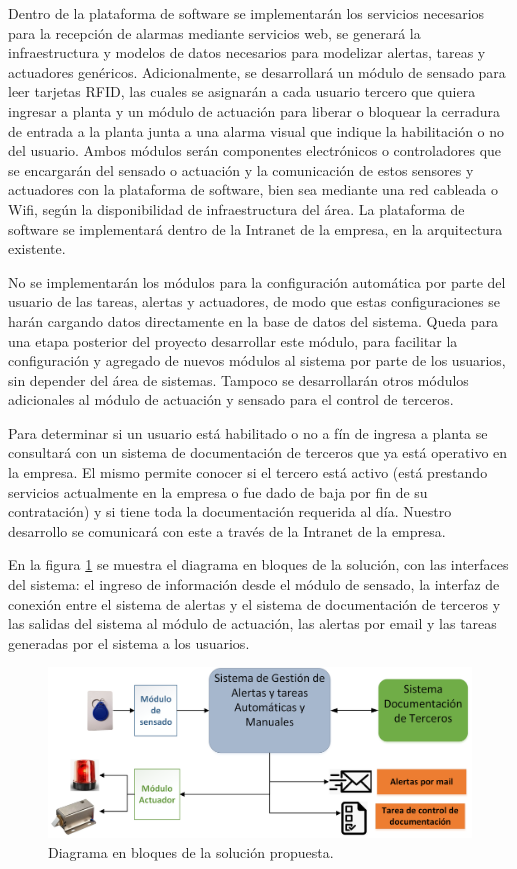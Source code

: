 Dentro de la plataforma de software se implementarán los servicios necesarios para la recepción de alarmas mediante servicios web, se generará la infraestructura y modelos de datos necesarios para modelizar alertas, tareas y actuadores genéricos. Adicionalmente, se desarrollará un módulo de sensado para leer tarjetas RFID, las cuales se asignarán a cada usuario tercero que quiera ingresar a planta y un módulo de actuación para liberar o bloquear la cerradura de entrada a la planta junta a una alarma visual que indique la habilitación o no del usuario. Ambos módulos serán componentes electrónicos o controladores que se encargarán del sensado o actuación y la comunicación de estos sensores y actuadores con la plataforma de software, bien sea mediante una red cableada o Wifi, según la disponibilidad de infraestructura del área. La plataforma de software se implementará dentro de la Intranet de la empresa, en la arquitectura existente.

No se implementarán los módulos para la configuración automática por parte del usuario de las tareas, alertas y actuadores, de modo que estas configuraciones se harán cargando datos directamente en la base de datos del sistema. Queda para una etapa posterior del proyecto desarrollar este módulo, para facilitar la configuración y agregado de nuevos módulos al sistema por parte de los usuarios, sin depender del área de sistemas. Tampoco se desarrollarán otros módulos adicionales al módulo de actuación y sensado para el control de terceros.

Para determinar si un usuario está habilitado o no a fín de ingresa a planta se consultará con un sistema de documentación de terceros que ya está operativo en la empresa. El mismo permite conocer si el tercero está activo (está prestando servicios actualmente en la empresa o fue dado de baja por fin de su contratación) y si tiene toda la documentación requerida al día. Nuestro desarrollo se comunicará con este a través de la Intranet de la empresa.

En la figura \ref{fig:Solucionbasica} se muestra el diagrama en bloques de la solución, con las interfaces del sistema: el ingreso de información desde el módulo de sensado, la interfaz de conexión entre el sistema de alertas y el sistema de documentación de terceros y las salidas del sistema al módulo de actuación, las alertas por email y las tareas generadas por el sistema a los usuarios.

\begin{figure}[ht]
	\centering
	\includegraphics[width=1\textwidth]{./Figures/solucionbasica.png}
	\caption{Diagrama en bloques de la solución propuesta.}
	\label{fig:Solucionbasica}
\end{figure}





